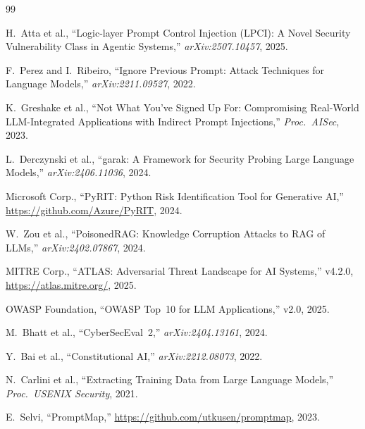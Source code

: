 \documentclass[10pt,twocolumn]{article}
\begin{document}
\begin{thebibliography}{99}\small

H.~Atta et al., ``Logic-layer Prompt Control Injection (LPCI): A Novel
Security Vulnerability Class in Agentic Systems,''
\textit{arXiv:2507.10457}, 2025.

F.~Perez and I.~Ribeiro, ``Ignore Previous Prompt: Attack Techniques for
Language Models,'' \textit{arXiv:2211.09527}, 2022.

K.~Greshake et al., ``Not What You've Signed Up For: Compromising Real-World
LLM-Integrated Applications with Indirect Prompt Injections,''
\textit{Proc.\ AISec}, 2023.

L.~Derczynski et al., ``garak: A Framework for Security Probing Large Language
Models,'' \textit{arXiv:2406.11036}, 2024.

Microsoft Corp., ``PyRIT: Python Risk Identification Tool for Generative AI,''
\url{https://github.com/Azure/PyRIT}, 2024.

W.~Zou et al., ``PoisonedRAG: Knowledge Corruption Attacks to RAG of LLMs,''
\textit{arXiv:2402.07867}, 2024.

MITRE Corp., ``ATLAS: Adversarial Threat Landscape for AI Systems,''
v4.2.0, \url{https://atlas.mitre.org/}, 2025.

OWASP Foundation, ``OWASP Top~10 for LLM Applications,'' v2.0, 2025.

M.~Bhatt et al., ``CyberSecEval~2,'' \textit{arXiv:2404.13161}, 2024.

Y.~Bai et al., ``Constitutional AI,'' \textit{arXiv:2212.08073}, 2022.

N.~Carlini et al., ``Extracting Training Data from Large Language Models,''
\textit{Proc.\ USENIX Security}, 2021.

E.~Selvi, ``PromptMap,'' \url{https://github.com/utkusen/promptmap}, 2023.

\end{thebibliography}
\end{document}
